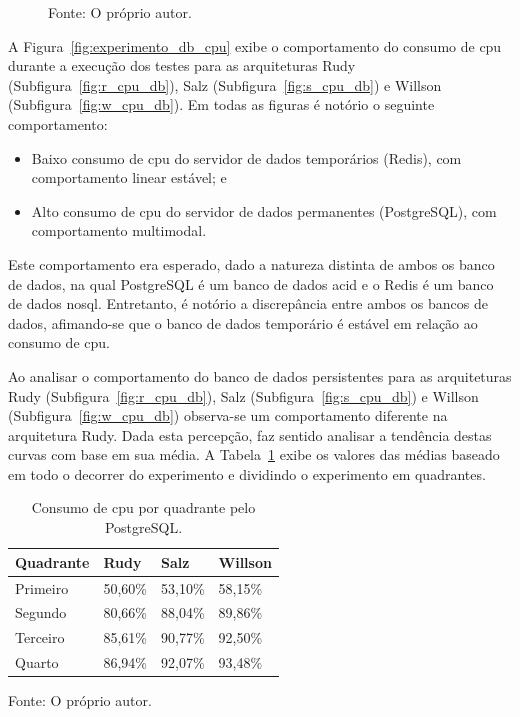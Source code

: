 \begin{figure}[htb!]
    Fonte: O próprio autor.
\end{figure}


A Figura~\ref{fig:experimento_db_cpu} exibe o comportamento do consumo de \ac{cpu} durante a execução dos testes para as arquiteturas Rudy (Subfigura~\ref{fig:r_cpu_db}), Salz (Subfigura~\ref{fig:s_cpu_db}) e Willson (Subfigura~\ref{fig:w_cpu_db}).
%
Em todas as figuras é notório o seguinte comportamento:

\begin{itemize}
 \item Baixo consumo de \ac{cpu} do servidor de dados temporários (Redis), com comportamento linear estável; e
 \item Alto consumo de \ac{cpu} do servidor de dados permanentes (PostgreSQL), com comportamento multimodal.
\end{itemize}

Este comportamento era esperado, dado a natureza distinta de ambos os banco de dados, na qual PostgreSQL é um banco de dados \ac{acid} e o Redis é um banco de dados \ac{nosql}.
%
Entretanto, é notório a discrepância entre ambos os bancos de dados, afimando-se que o banco de dados temporário é estável em relação ao consumo de \ac{cpu}.

Ao analisar o comportamento do banco de dados persistentes para as arquiteturas Rudy (Subfigura~\ref{fig:r_cpu_db}), Salz (Subfigura~\ref{fig:s_cpu_db}) e Willson (Subfigura~\ref{fig:w_cpu_db}) observa-se um comportamento diferente na arquitetura Rudy.
%
Dada esta percepção, faz sentido analisar a tendência destas curvas com base em sua média.
%
A Tabela~\ref{tab:cpu_db_media_quadrantes} exibe os valores das médias baseado em todo o decorrer do experimento e dividindo o experimento em quadrantes.

\begin{table}[htb!]
\centering
\begin{adjustbox}{max width=\textwidth}
\caption{Consumo de \ac{cpu} por quadrante pelo PostgreSQL.}
\label{tab:cpu_db_media_quadrantes}
\begin{tabular}{l|l|l|l}

\hline \hline

Quadrante & Rudy    & Salz    & Willson \\ \hline \hline

Primeiro  & 50,60\% & 53,10\% & 58,15\% \\ \hline

Segundo   & 80,66\% & 88,04\% & 89,86\% \\ \hline

Terceiro  & 85,61\% & 90,77\% & 92,50\% \\ \hline

Quarto    & 86,94\% & 92,07\% & 93,48\% \\ \hline \hline

\end{tabular}

\end{adjustbox}

Fonte: O próprio autor.
\end{table}

